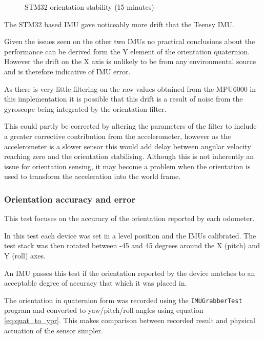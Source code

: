 \documentclass{entcs}
\begin{document}
\begin{figure}[h!]
  \centering
  \scalebox{0.7}{}
  \caption{STM32 orientation stability (15 minutes)}
  \label{fig:15_min_orientation_stability_stm32}
\end{figure}

The STM32 based IMU gave noticeably more drift that the Teensy IMU.

Given the issues seen on the other two IMUs no practical conclusions about the
performance can be derived form the Y element of the orientation quaternion.
However the drift on the X axis is unlikely to be from any environmental source
and is therefore indicative of IMU error.

As there is very little filtering on the raw values obtained from the MPU6000 in
this implementation it is possible that this drift is a result of noise from the
gyroscope being integrated by the orientation filter.

This could partly be corrected by altering the parameters of the filter to
include a greater corrective contribution from the accelerometer, however as the
accelerometer is a slower sensor this would add delay between angular velocity
reaching zero and the orientation stabilising. Although this is not inherently
an issue for orientation sensing, it may become a problem when the orientation
is used to transform the acceleration into the world frame.

\subsubsection{Orientation accuracy and error}

This test focuses on the accuracy of the orientation reported by each odometer.

In this test each device was set in a level position and the IMUs calibrated.
The test stack was then rotated between -45 and 45 degrees around the X
(pitch) and Y (roll) axes.

An IMU passes this test if the orientation reported by the device matches to an
acceptable degree of accuracy that which it was placed in.

The orientation in quaternion form was recorded using the
\texttt{IMUGrabberTest} program and converted to yaw/pitch/roll angles using
equation \ref{eq:quat_to_ypr}. This makes comparison between recorded result and
physical actuation of the sensor simpler.
\end{document}
